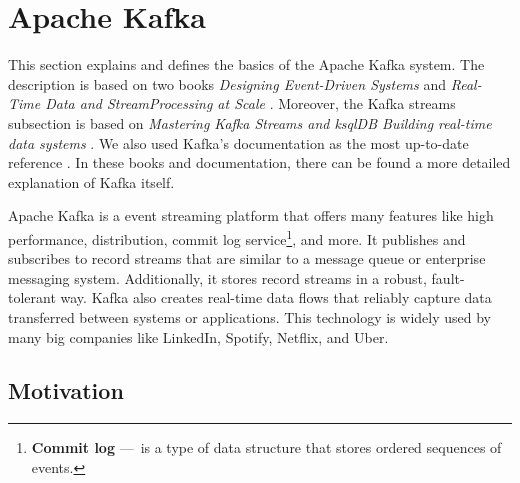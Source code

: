 \section{Apache Kafka}
\label{02:sec:title}

This section explains and defines the basics of the Apache Kafka system. The description is based on two books \emph{Designing Event-Driven Systems} \cite{apacheKafkaDesignDistributedSystems} and \emph{Real-Time Data and StreamProcessing at Scale} \cite{apacheKafkaDefinitiveGuide}. Moreover, the Kafka streams subsection is based on \emph{Mastering Kafka Streams and ksqlDB Building real-time data systems} \cite{kafkaStreamsBook}. We also used Kafka's documentation as the most up-to-date reference \cite{kafkaDocumentation}. In these books and documentation, there can be found a more detailed explanation of Kafka itself.

Apache Kafka is a event streaming platform that offers many features like high performance, distribution, commit log service\footnote{\textbf{Commit log} 
---\ is a type of data structure that stores ordered sequences of events.}, and more. It publishes and subscribes to record streams that are similar to a message queue or enterprise messaging system. Additionally, it stores record streams in a robust, fault-tolerant way. Kafka also creates real-time data flows that reliably capture data transferred between systems or applications. This technology is widely used by many big companies like LinkedIn, Spotify, Netflix, and Uber.
\subsection{Motivation \cite{02-bachelor-thesis}}
\label{kafka:motivation}

